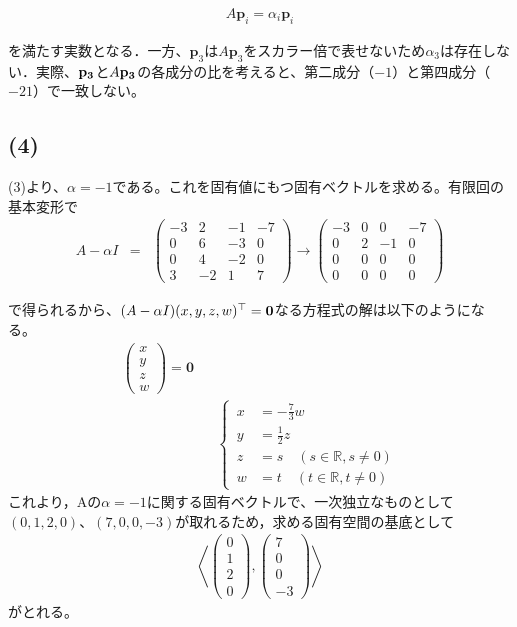 \documentclass[11pt, titlepage]{jsarticle}
\begin{document}
\begin{eqnarray*}
  A \boldsymbol p_i = \alpha_i \boldsymbol p_i
\end{eqnarray*}

を満たす実数となる．一方、$\boldsymbol p_3$は$A \boldsymbol p_3$をスカラー倍で表せないため$\alpha_3$は存在しない．実際、$\vb{p_3}$と$A\vb{p_3}$の各成分の比を考えると、第二成分（$-1$）と第四成分（$-21$）で一致しない。

\newpage
\subsection*{(4)}
(3)より、$\alpha=-1$である。これを固有値にもつ固有ベクトルを求める。有限回の基本変形で
\begin{eqnarray*}
  A-\alpha I&=&\begin{pmatrix}
    -3 & 2  & -1 & -7 \\
    0  & 6  & -3 & 0  \\
    0  & 4  & -2 & 0  \\
    3  & -2 & 1  & 7
  \end{pmatrix}\rightarrow\begin{pmatrix}
    -3 & 0 & 0  & -7 \\
    0  & 2 & -1 & 0  \\
    0  & 0 & 0  & 0  \\
    0  & 0 & 0  & 0
  \end{pmatrix}
\end{eqnarray*}

で得られるから、$(A-\alpha I)(x, y, z, w)^\top = \vb{0}$なる方程式の解は以下のようになる。
\begin{eqnarray*}
  \begin{pmatrix}
    x \\
    y \\
    z \\
    w
  \end{pmatrix}=\boldsymbol 0\\
  &&
  \left\{ \,
  \begin{aligned}
    x & =-\frac{7}{3}w                   \\
    y & =\frac{1}{2}z                    \\
    z & =s\quad (s\in\mathbb R, s\neq 0) \\
    w & =t\quad (t\in\mathbb R, t\neq 0)
  \end{aligned}
  \right.
\end{eqnarray*}
これより，Aの$\alpha=-1$に関する固有ベクトルで、一次独立なものとして$(0,1,2,0)$、$(7, 0, 0, -3)$が取れるため，求める固有空間の基底として
\begin{eqnarray*}
  \left\langle
  \begin{pmatrix}
    0 \\
    1 \\
    2 \\
    0
  \end{pmatrix},\begin{pmatrix}
    7 \\
    0 \\
    0 \\
    -3
  \end{pmatrix}
  \right\rangle
\end{eqnarray*}
がとれる。
\end{document}
